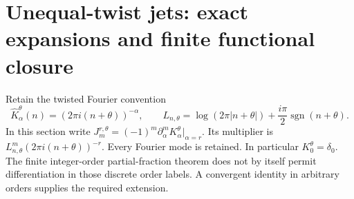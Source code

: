 
\section{Unequal-twist jets: exact expansions and finite functional closure}
\label{utj:sec:main}
Retain the twisted Fourier convention
\[
 \widehat K_\alpha^\theta(n)=(2\pi i(n+\theta))^{-\alpha},\qquad
 L_{n,\theta}=\log(2\pi|n+\theta|)
       +\frac{i\pi}{2}\operatorname{sgn}(n+\theta).
\]
In this section write
$J_m^{r,\theta}=(-1)^m\partial_\alpha^mK_\alpha^\theta|_{\alpha=r}$.
Its multiplier is $L_{n,\theta}^m(2\pi i(n+\theta))^{-r}$.
Every Fourier mode is retained. In particular $K_0^\theta=\delta_0$.
The finite integer-order partial-fraction theorem does not by itself
permit differentiation in those discrete order labels. A convergent
identity in arbitrary orders supplies the required extension.

